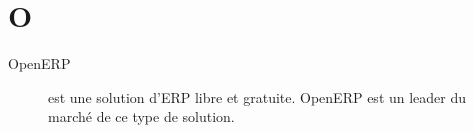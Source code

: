 \section{O}

\begin{description}

\item[OpenERP] est une solution d'ERP libre et gratuite. OpenERP est un leader
du marché de ce type de solution.


\end{description}

